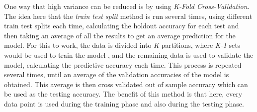 \documentclass[11pt]{article}
\begin{document}
One way that high variance can be reduced is by using \textit{K-Fold Cross-Validation}. The idea here that the \textit{train test split} method is run several times, using different train test splits each time, calculating the holdout accuracy for each test and then taking an average of all the results to get an average prediction for the model. For this to work, the data is divided into \textit{K} partitions, where \textit{K-1} sets would be used to train the model , and the remaining data is used to validate the model, calculating the predictive accuracy each time. This process is repeated several times, until an average of the validation accuracies of the model is obtained. This average is then cross validated out of sample accuracy which can be used as the testing accuracy.  The benefit of this method is that here, every data point is used during the training phase and also during the testing phase.
\end{document}
